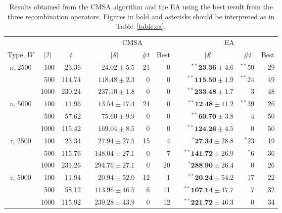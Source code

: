 \documentclass{IEEEtran}
\begin{document}
\begin{table}[h!]
\setlength{\tabcolsep}{10pt}
\centering
\caption{Results obtained from the CMSA algorithm and the EA using the best result from the three recombination operators. Figures in bold and asterisks should be interpreted as in Table~\ref{table:ea}.}
\small
\begin{threeparttable}
\begin{tabular}{crrcrrrcrrr}
	\toprule
	& & & & \multicolumn{3}{c}{CMSA} &\phantom{ab}& \multicolumn{3}{c}{EA}\\
	\cmidrule{5-7} \cmidrule{9-11}
	\multicolumn{1}{c}{Type, $W$} & \multicolumn{1}{c}{$|\mathcal{I}|$} & \multicolumn{1}{c}{$t$\tnote{$a$}} && \multicolumn{1}{c}{$|\mathcal{S}|$\tnote{$b$}} & \multicolumn{1}{c}{$\# t$\tnote{$c$}} & \multicolumn{1}{c}{Best\tnote{$d$}} && \multicolumn{1}{c}{$|\mathcal{S}|$} & \multicolumn{1}{c}{$\# t$} & \multicolumn{1}{c}{Best}\\
	\midrule
	a, 2500 & 100 & 23.36 && $24.02 \pm 5.5$ & 21 & 0 && $^{**}\textbf{23.36} \pm 4.6$ & $^{**}$50 & 29 \\
	& 500 & 114.74 && $118.48 \pm 2.3$ & 0 & 0 && $^{**}\textbf{115.50} \pm 1.9$ & $^{**}$24 & 49 \\
	& 1000 & 230.24 && $237.10 \pm 1.8$ & 0 & 0 && $^{**}\textbf{233.48} \pm 1.7$ & 3 & 48 \\
	\midrule
	a, 5000 & 100 & 11.96 && $13.54 \pm 17.4$ & 24 & 0 && $^{**}\textbf{12.48} \pm 11.2$ & $^{**}$39 & 26 \\
	& 500 & 57.62 && $75.60 \pm 9.9$ & 0 & 0 && $^{**}\textbf{60.70} \pm 3.8$ & 4 & 50 \\
	& 1000 & 115.42 && $169.04 \pm 8.5$ & 0 & 0 && $^{**}\textbf{124.26} \pm 4.5$ & 0 & 50 \\
	\midrule
	\midrule
	r, 2500 & 100 & 23.34 && $27.94 \pm 27.5$ & 15 & 4 && $^{*}\textbf{27.34} \pm 28.8$ & $^{*}$23 & 19 \\
	& 500 & 115.76 && $148.04 \pm 27.1$ & 0 & 7 && $^{**}\textbf{141.72} \pm 26.9$ & $^{*}$6 & 36 \\
	& 1000 & 231.26 && $294.76 \pm 27.1$ & 0 & 20 && $^{*}\textbf{288.90} \pm 26.4$ & 0 & 26 \\
	\midrule
	r, 5000 & 100 & 11.94 && $20.94 \pm 52.0$ & 12 & 1 && $^{**}\textbf{20.24} \pm 54.2$ & 17 & 22 \\
	& 500 & 58.12 && $113.96 \pm 46.5$ & 6 & 11 && $^{**}\textbf{107.14} \pm 47.7$ & 7 & 32 \\
	& 1000 & 115.92 && $239.28 \pm 43.9$ & 0 & 12 && $^{**}\textbf{221.72} \pm 46.3$ & 0 & 34 \\

\end{tabular}
\end{threeparttable}
\end{table}
\end{document}
